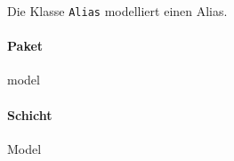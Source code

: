 Die Klasse \verb#Alias# modelliert einen Alias.

\paragraph*{Paket}
model

\paragraph*{Schicht}
Model